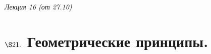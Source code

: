 \begin{flushright}
    \textit{Лекция 16 (от 27.10)}
\end{flushright}
\section{$\S 21.$ Геометрические принципы.}
